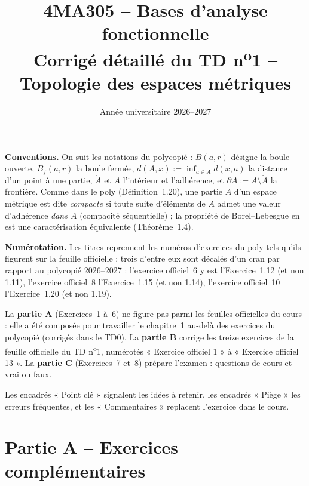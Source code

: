 \documentclass[11pt,a4paper]{article}
\title{\textbf{4MA305 -- Bases d'analyse fonctionnelle}\\[2mm]
\Large Corrigé détaillé du TD n\textsuperscript{o}1 -- Topologie des espaces métriques}
\author{}
\date{Année universitaire 2026--2027}
\newcommand{\interieur}[1]{\mathring{#1}}
\newcommand{\adh}[1]{\overline{#1}}
\newcommand{\Bf}{B_f}
\theoremstyle{definition}
\begin{document}
\maketitle

\begin{commentaire}
\textbf{Conventions.} On suit les notations du polycopié : $B(a,r)$ désigne la boule ouverte, $\Bf(a,r)$ la boule fermée, $d(A,x):=\inf_{a\in A} d(x,a)$ la distance d'un point à une partie, $\interieur{A}$ et $\adh{A}$ l'intérieur et l'adhérence, et $\partial A := \adh{A}\setminus\interieur{A}$ la frontière. Comme dans le poly (Définition~1.20), une partie $A$ d'un espace métrique est dite \emph{compacte} si toute suite d'éléments de $A$ admet une valeur d'adhérence \emph{dans $A$} (compacité séquentielle) ; la propriété de Borel--Lebesgue en est une caractérisation équivalente (Théorème~1.4).

\textbf{Numérotation.} Les titres reprennent les numéros d'exercices du poly tels qu'ils figurent sur la feuille officielle ; trois d'entre eux sont décalés d'un cran par rapport au polycopié 2026--2027 : l'exercice officiel~6 y est l'Exercice~1.12 (et non 1.11), l'exercice officiel~8 l'Exercice~1.15 (et non 1.14), l'exercice officiel~10 l'Exercice~1.20 (et non 1.19).

La \textbf{partie A} (Exercices~1 à~6) ne figure pas parmi les feuilles officielles du cours : elle a été composée pour travailler le chapitre~1 au-delà des exercices du polycopié (corrigés dans le TD0). La \textbf{partie B} corrige les treize exercices de la feuille officielle du TD n\textsuperscript{o}1, numérotés « Exercice officiel 1 » à « Exercice officiel 13 ». La \textbf{partie C} (Exercices~7 et~8) prépare l'examen : questions de cours et vrai ou faux.

Les encadrés « Point clé » signalent les idées à retenir, les encadrés « Piège » les erreurs fréquentes, et les « Commentaires » replacent l'exercice dans le cours.
\end{commentaire}

\section*{Partie A -- Exercices complémentaires}
\end{document}
